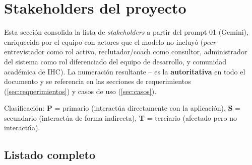 \section{Stakeholders del proyecto}
\label{sec:stakeholders}

Esta sección consolida la lista de \textit{stakeholders} a partir del
prompt 01 (Gemini), enriquecida por el equipo con actores que el modelo
no incluyó (\textit{peer} entrevistador como rol activo,
reclutador/coach como consultor, administrador del sistema como rol
diferenciado del equipo de desarrollo, y comunidad académica de IHC).
La numeración resultante -- es la \textbf{autoritativa} en
todo el documento y se referencia en las secciones de requerimientos
(\ref{sec:requerimientos}) y casos de uso (\ref{sec:casos}).

Clasificación: \textbf{P} = primario (interactúa directamente con la
aplicación), \textbf{S} = secundario (interactúa de forma indirecta),
\textbf{T} = terciario (afectado pero no interactúa).

\subsection{Listado completo}

